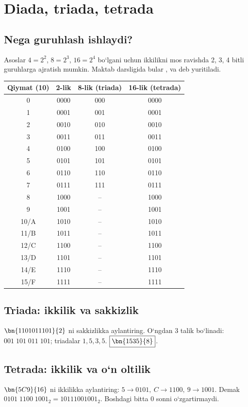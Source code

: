 \documentclass[11pt,a4paper,openany,oneside]{book}
\begin{document}
\chapter{Diada, triada, tetrada}
\section{Nega guruhlash ishlaydi?}
Asoslar \(4=2^2\), \(8=2^3\), \(16=2^4\) bo‘lgani uchun ikkilikni mos ravishda 2, 3, 4 bitli guruhlarga ajratish mumkin. Maktab darsligida bular ,  va  deb yuritiladi. 
\begin{center}\renewcommand{\arraystretch}{1.2}
\begin{tabular}{@{}c c c c@{}}\toprule
Qiymat (10) & 2-lik & 8-lik (triada) & 16-lik (tetrada) \\ \midrule
0 & 0000 & 000 & 0000 \\
1 & 0001 & 001 & 0001 \\
2 & 0010 & 010 & 0010 \\
3 & 0011 & 011 & 0011 \\
4 & 0100 & 100 & 0100 \\
5 & 0101 & 101 & 0101 \\
6 & 0110 & 110 & 0110 \\
7 & 0111 & 111 & 0111 \\
8 & 1000 & -- & 1000 \\
9 & 1001 & -- & 1001 \\
10/A & 1010 & -- & 1010 \\
11/B & 1011 & -- & 1011 \\
12/C & 1100 & -- & 1100 \\
13/D & 1101 & -- & 1101 \\
14/E & 1110 & -- & 1110 \\
15/F & 1111 & -- & 1111 \\
\bottomrule\end{tabular}\end{center}
\section{Triada: ikkilik va sakkizlik}
\begin{worked}
\(\bn{1101011101}{2}\) ni sakkizlikka aylantiring. O‘ngdan 3 talik bo‘linadi: \(001\;101\;011\;101\); triadalar \(1,5,3,5\). \(\boxed{\bn{1535}{8}}\).
\end{worked}
\section{Tetrada: ikkilik va o‘n oltilik}
\begin{worked}
\(\bn{5C9}{16}\) ni ikkilikka aylantiring:
\(5\to0101,\ C\to1100,\ 9\to1001\). Demak \(0101\;1100\;1001_2=10111001001_2\). Boshdagi bitta 0 sonni o‘zgartirmaydi.
\end{worked}
\end{document}
